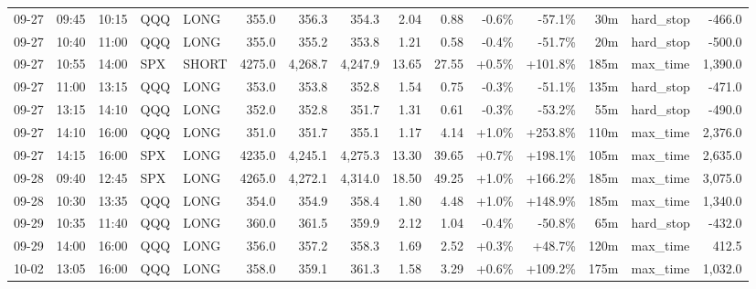 \documentclass[11pt,a4paper,twoside]{article}
\begin{document}
\begin{landscape}
\begin{center}
\begin{longtable}{>{\color{txtmain}}l l l l l r r r r r r r r >{\color{txtmain}}l r}
09-27 & 09:45 & 10:15 & QQQ & LONG & 355.0 & 356.3 & 354.3 & 2.04 & 0.88 & \textcolor{lossred}{-0.6\%} & \textcolor{lossred}{-57.1\%} & 30m & hard\_stop & \textcolor{lossred}{-466.0} \\
09-27 & 10:40 & 11:00 & QQQ & LONG & 355.0 & 355.2 & 353.8 & 1.21 & 0.58 & \textcolor{lossred}{-0.4\%} & \textcolor{lossred}{-51.7\%} & 20m & hard\_stop & \textcolor{lossred}{-500.0} \\
09-27 & 10:55 & 14:00 & SPX & SHORT & 4275.0 & 4,268.7 & 4,247.9 & 13.65 & 27.55 & \textcolor{wingreen}{+0.5\%} & \textcolor{wingreen}{+101.8\%} & 185m & max\_time & \textcolor{wingreen}{1,390.0} \\
09-27 & 11:00 & 13:15 & QQQ & LONG & 353.0 & 353.8 & 352.8 & 1.54 & 0.75 & \textcolor{lossred}{-0.3\%} & \textcolor{lossred}{-51.1\%} & 135m & hard\_stop & \textcolor{lossred}{-471.0} \\
09-27 & 13:15 & 14:10 & QQQ & LONG & 352.0 & 352.8 & 351.7 & 1.31 & 0.61 & \textcolor{lossred}{-0.3\%} & \textcolor{lossred}{-53.2\%} & 55m & hard\_stop & \textcolor{lossred}{-490.0} \\
09-27 & 14:10 & 16:00 & QQQ & LONG & 351.0 & 351.7 & 355.1 & 1.17 & 4.14 & \textcolor{wingreen}{+1.0\%} & \textcolor{wingreen}{+253.8\%} & 110m & max\_time & \textcolor{wingreen}{2,376.0} \\
09-27 & 14:15 & 16:00 & SPX & LONG & 4235.0 & 4,245.1 & 4,275.3 & 13.30 & 39.65 & \textcolor{wingreen}{+0.7\%} & \textcolor{wingreen}{+198.1\%} & 105m & max\_time & \textcolor{wingreen}{2,635.0} \\
09-28 & 09:40 & 12:45 & SPX & LONG & 4265.0 & 4,272.1 & 4,314.0 & 18.50 & 49.25 & \textcolor{wingreen}{+1.0\%} & \textcolor{wingreen}{+166.2\%} & 185m & max\_time & \textcolor{wingreen}{3,075.0} \\
09-28 & 10:30 & 13:35 & QQQ & LONG & 354.0 & 354.9 & 358.4 & 1.80 & 4.48 & \textcolor{wingreen}{+1.0\%} & \textcolor{wingreen}{+148.9\%} & 185m & max\_time & \textcolor{wingreen}{1,340.0} \\
09-29 & 10:35 & 11:40 & QQQ & LONG & 360.0 & 361.5 & 359.9 & 2.12 & 1.04 & \textcolor{lossred}{-0.4\%} & \textcolor{lossred}{-50.8\%} & 65m & hard\_stop & \textcolor{lossred}{-432.0} \\
09-29 & 14:00 & 16:00 & QQQ & LONG & 356.0 & 357.2 & 358.3 & 1.69 & 2.52 & \textcolor{wingreen}{+0.3\%} & \textcolor{wingreen}{+48.7\%} & 120m & max\_time & \textcolor{wingreen}{412.5} \\
10-02 & 13:05 & 16:00 & QQQ & LONG & 358.0 & 359.1 & 361.3 & 1.58 & 3.29 & \textcolor{wingreen}{+0.6\%} & \textcolor{wingreen}{+109.2\%} & 175m & max\_time & \textcolor{wingreen}{1,032.0} \\

\end{longtable}
\end{center}
\end{landscape}
\end{document}
